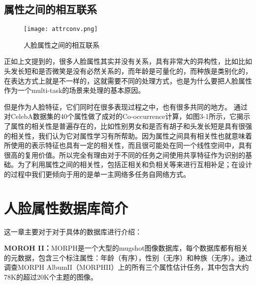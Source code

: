 \subsection{属性之间的相互联系}
\begin{figure}[!ht]
 \centering
	\texttt{[image: attrconv.png]}
	\caption{人脸属性之间的相互联系}
\end{figure}


正如上文提到的，很多人脸属性其实并没有关系，具有非常大的异构性，比如比如头发长短和是否微笑是没有必然关系的，而年龄是可量化的，而种族是类别化的，在表达方式上就是不一样的，这就需要不同的处理方式，也是为什么要把人脸属性作为一个multi-task的场景来处理的基本原因。

但是作为人脸特征，它们同时在很多表现过程之中，也有很多共同的地方。
通过对CelebA数据集的40个属性做了成对的Co-occurrence计算，如图3-1所示，它揭示了属性的相关性是普遍存在的，比如性别男女和是否有胡子和头发长短是具有很强的相关性，我们认为它对属性学习有所帮助。因为属性之间具有相关性也就意味着所使用的表示特征也具有一定的相关性，而且很可能处在同一个线性空间中，具有很高的复用价值。所以完全有理由对于不同的任务之间使用共享特征作为识别的基础。为了利用属性之间的相关性，包括正相关和负相关等来进行互相补足；在设计的过程中我们更倾向于用的是单一主网络多任务自网络方式。

\section{人脸属性数据库简介}
这一章主要对于对于具体的数据库进行介绍：

\textbf{MOROH II：}MORPH是一个大型的mugshot图像数据库，每个数据库都有相关的元数据，包含三个标注属性：年龄（有序），性别（无序）和种族（无序）。通过调查MORPH AlbumII（MORPHII）上的所有三个属性估计任务，其中包含大约78K的超过20K个主题的图像。


